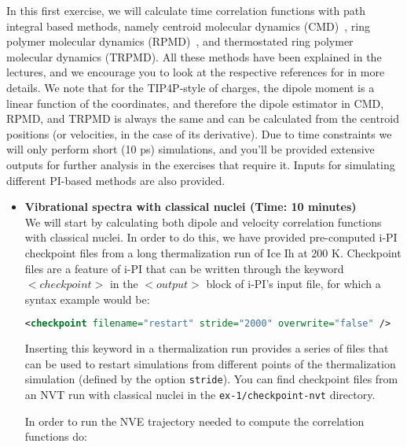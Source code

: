 \documentclass{article}
\begin{document}
\begin{Exercise}[label={realtime},title={Velocity and dipole real time correlation functions}]

In this first exercise, we will calculate time correlation functions with path integral based methods, namely centroid molecular dynamics (CMD)~\cite{cao-voth94jcp}, ring polymer molecular dynamics (RPMD)~\cite{crai-mano04jcp}, and thermostated ring polymer molecular dynamics (TRPMD)\cite{ross+14jcp}. All these methods have been explained in the lectures, and we encourage you to look at the respective references for in more details. We note that for the TIP4P-style of charges, the dipole moment is a linear function of the coordinates, and therefore the dipole estimator in CMD, RPMD, and TRPMD is always the same and can be calculated from the centroid positions (or velocities, in the case of its derivative). Due to time constraints we will only perform short (10 ps) simulations, and you'll be provided extensive outputs for further analysis in the exercises that require it. Inputs for simulating different PI-based methods are also provided.

\begin{itemize}

\item \textbf{Vibrational spectra with classical nuclei (Time: 10 minutes)} \\
We will start by calculating both dipole and velocity correlation functions with classical nuclei. In order to do this, we have provided pre-computed i-PI checkpoint files from a long thermalization run of Ice Ih at 200 K. Checkpoint files are a feature of i-PI that can be written through the keyword \lstinxml$<checkpoint>$ in the \lstinxml$<output>$ block of i-PI's input file, for which a syntax example would be:
    
\begin{lstlisting}[language=XML]
<checkpoint filename="restart" stride="2000" overwrite="false" />
\end{lstlisting}

    Inserting this keyword in a thermalization run provides a series of files that can be used to restart simulations from different points of the thermalization simulation (defined by the option \texttt{stride}). You can find checkpoint files from an NVT run with classical nuclei in the \texttt{ex-1/checkpoint-nvt} directory. 
    
    In order to run the NVE trajectory needed to compute the correlation functions do:
    

\end{itemize}
\end{Exercise}
\end{document}
